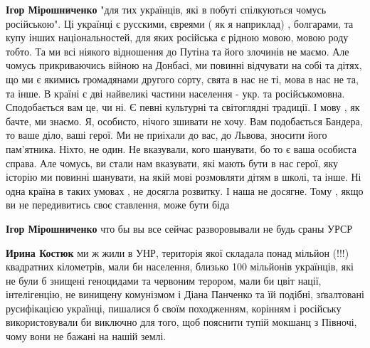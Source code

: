 \begin{itemize}
\begin{itemize}
 
\textbf{Ігор Мірошниченко} "для тих українців, які в побуті спілкуються чомусь
російською". Ці українці є русскими, євреями ( як я наприклад) , болгарами, та
купу інших національностей, для яких російська є рідною мовою, мовою роду
тобто. Та ми всі ніякого відношення до Путіна та його злочинів не маємо. Але
чомусь прикриваючись війною на Донбасі, ми повинні відчувати на собі та дітях,
що ми є якимись громадянами другого сорту, свята в нас не ті, мова в нас не та,
та інше. В країні є дві найвеликі частини населення - укр. та російськомовна.
Сподобається вам це, чи ні. Є певні культурні та світоглядні традиції. І мову ,
як бачте, ми знаємо. Я, особисто, нічого зшивати не хочу. Вам подобається
Бандера, то ваше діло, ваші герої. Ми не приіхали до вас, до Львова, зносити
його пам'ятника. Ніхто, не один. Не вказували, кого шанувати, бо то є ваша
особиста справа. Але чомусь, ви стали нам вказувати, які мають бути в нас
герої, яку історію ми повинні шанувати, на якій мові розмовляти дітям в школі,
та інше. Ні одна країна в таких умовах , не досягла розвитку. І наша не
досягне. Тому , якщо ви не передивитись своє ставлення, може бути біда

 
\textbf{Ігор Мірошниченко} что бы вы все сейчас разворовывали не будь сраны УРСР 👿

 

\textbf{Ирина Костюк} ми ж жили в УНР, територія якої складала понад мільйон
(!!!) квадратних кілометрів, мали би населення, близько 100 мільйонів
українців, які не були б знищені геноцидами та червоним терором, мали би цвіт
нації, інтелігенцію, не винищену комунізмом і Діана Панченко та їй подібні,
зґвалтовані русифікацією українці, пишалися б своїм походженням, корінням і
російську використовували би виключно для того, щоб пояснити тупій мокшанц з
Півночі, чому вони не бажані на нашій землі.


\end{itemize}
\end{itemize}
